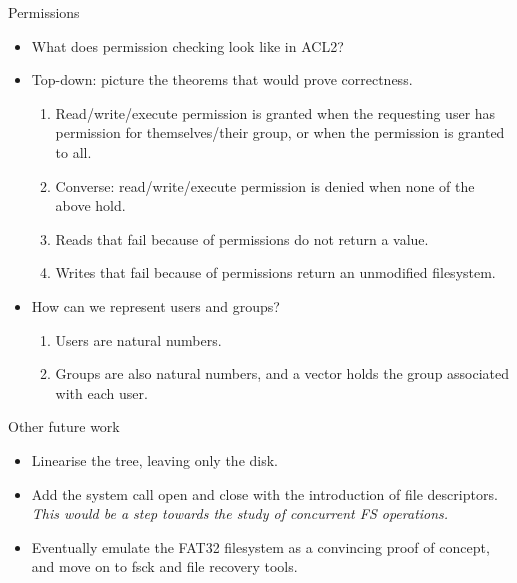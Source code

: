 \documentclass{beamer}
\begin{document}
\begin{frame}{Permissions}
  \begin{itemize}
  \item What does permission checking look like in ACL2?
  \item Top-down: picture the theorems that would prove correctness.
    \begin{enumerate}
    \item Read/write/execute permission is granted when the requesting
      user has permission for themselves/their group, or when the
      permission is granted to all.
    \item Converse: read/write/execute permission is denied when none
      of the above hold.
    \item Reads that fail because of permissions do not return a value.
    \item Writes that fail because of permissions return an unmodified
      filesystem.
    \end{enumerate}
  \item How can we represent users and groups?
    \begin{enumerate}
    \item Users are natural numbers.
    \item Groups are also natural numbers, and a vector holds the
      group associated with each user.
    \end{enumerate}
  \end{itemize}
\end{frame}

\begin{frame}{Other future work}
  \begin{itemize}
  \item Linearise the tree, leaving only the disk.
  \item Add the system call open and close with the
    introduction of file descriptors.\\
    \textit{This would be a step towards the study of concurrent FS operations.}
  \item Eventually emulate the FAT32 filesystem as a convincing proof
    of concept, and move on to fsck and file recovery tools.
  \end{itemize}
\end{frame}
\end{document}
